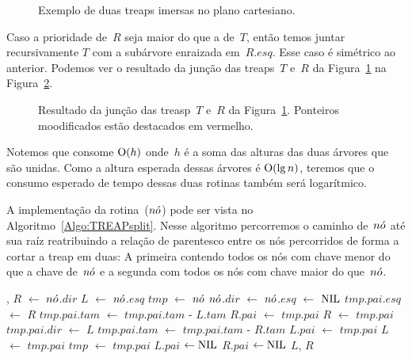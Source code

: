 \begin{figure}[htb]
\centering

\caption{Exemplo de duas treaps imersas no plano cartesiano.}
\label{fig:treap-join}
\end{figure}


Caso a prioridade de~$R$ seja maior do que a de~$T$, então temos juntar recursivamente $T$ com a subárvore enraizada em~$R$.$esq$. Esse caso é simétrico ao anterior.
Podemos ver o resultado da junção das treaps~$T$ e~$R$ da Figura~\ref{fig:treap-join} na Figura~\ref{fig:treap-join-depois}.




\begin{figure}[htb]
\centering

\caption{Resultado da junção das treasp~$T$ e~$R$ da Figura~\ref{fig:treap-join}. Ponteiros moodificados estão destacados em vermelho.}
\label{fig:treap-join-depois}
\end{figure}
Notemos que \treapJoin{} consome $\mathrm{O}(h)$ onde~$h$ é a soma das alturas das duas árvores que são unidas.
Como a altura esperada dessas árvores é $\mathrm{O}(\lg n)$, teremos que o consumo esperado de tempo dessas duas rotinas também será logarítmico.


A implementação da rotina~\treapSplit($\node$) pode ser vista no Algoritmo~\ref{Algo:TREAPsplit}.
Nesse algoritmo percorremos o caminho de~$\node$ até sua raíz reatribuindo a relação de parentesco entre os nós percorridos de forma a cortar a treap em duas:
A primeira contendo todos os nós com chave menor do que a chave de~$\node$ e a segunda com todos os nós com chave maior do que~$\node$.


\begin{algorithm}
\caption{\treapSplit($\node$)}
\label{Algo:TREAPsplit}
\begin{algorithmic}[1]
\If { $\node$ $=$ \Nil} \Return \Nil, \Nil
\EndIf
\State $R$ $\gets $ $\node$.$dir$
\State $L$ $\gets $ $\node$.$esq$
\State $tmp$ $\gets$ $\node$
\State $\node$.$dir$ $\gets $ $\node$.$esq$ $\gets $ $\text{NIL}$
    \State $tmp$.$pai$.$esq$ $\gets$ $R$
    \State $tmp$.$pai$.$tam$ $\gets$ $tmp$.$pai$.$tam$ - $L$.$tam$
    \EndIf
    \State $R$.$pai$ $\gets$ $tmp$.$pai$
    \EndIf
    \State $R$ $\gets$ $tmp$.$pai$
  \Else
    \State $tmp$.$pai$.$dir$ $\gets$ $L$ 
    \State $tmp$.$pai$.$tam$ $\gets$ $tmp$.$pai$.$tam$ - $R$.$tam$
    \EndIf
    \State $L$.$pai$ $\gets$ $tmp$.$pai$
    \EndIf
    \State $L$ $\gets$ $tmp$.$pai$
  \EndIf
  \State $tmp$ $\gets$ $tmp$.$pai$
\EndWhile
{} $L$.$pai$ $\gets\text{NIL}$\EndIf
{} $R$.$pai$ $\gets\text{NIL}$\EndIf
\State\Return $L$, $R$
\end{algorithmic}
\end{algorithm}


